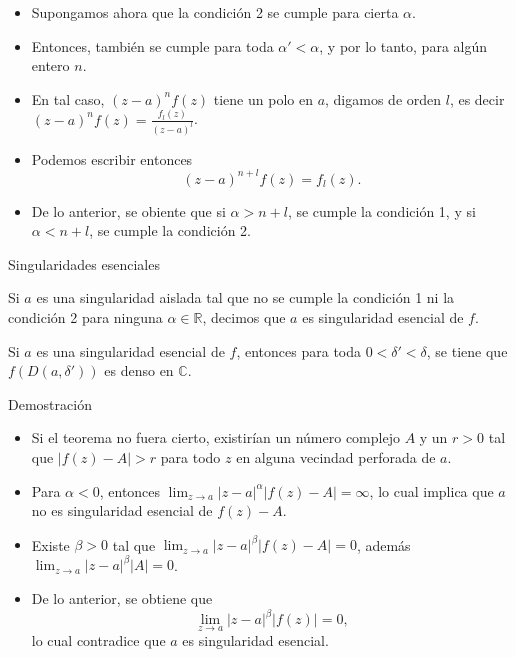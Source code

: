 \documentclass[spanish,presentation]{beamer}
\begin{document}
\begin{frame}[label=sec-2-3]{}
\begin{itemize}
\item Supongamos ahora que la condición 2 se cumple para cierta \(\alpha\).
\item Entonces, también se cumple para toda \(\alpha'<\alpha\), y por
lo tanto, para algún entero \(n\).
\item En tal caso, \((z-a)^{n}f(z)\) tiene un polo en \(a\), digamos
de orden \(l\), es decir \((z-a)^{n}f(z)=\frac{f_{l}(z)}{(z-a)^{l}}\).
\item Podemos escribir entonces
\begin{displaymath}
(z-a)^{n+l}f(z)=f_{l}(z).
\end{displaymath}
\item De lo anterior, se obiente que si \(\alpha>n+l\), se cumple la condición
1, y si \(\alpha<n+l\), se cumple la condición 2.
\end{itemize}
\end{frame}

\begin{frame}[label=sec-2-4]{Singularidades esenciales}
\begin{definition}
Si \(a\) es una singularidad aislada tal que no se cumple la
condición 1 ni la condición 2 para ninguna \(\alpha\in
    \mathbb{R}\), decimos que \(a\) es \alert{singularidad esencial} de \(f\).
\end{definition}

\begin{theorem}
Si \(a\) es una singularidad esencial de \(f\), entonces para toda
\(0<\delta'<\delta\), se tiene que \(f(D(a,\delta'))\) es denso en
\(\mathbb{C}\). 
\end{theorem}
\end{frame}

\begin{frame}[label=sec-2-5]{Demostración}
\begin{itemize}
\item Si el teorema no fuera cierto, existirían un número complejo
\(A\) y un \(r>0\) tal que \(|f(z)-A|>r\) para todo \(z\) en
alguna vecindad perforada de \(a\).
\item Para \(\alpha<0\), entonces \(\lim_{z\to
     a}|z-a|^{\alpha}|f(z)-A|=\infty\), lo cual implica que \(a\) no
es singularidad esencial de \(f(z)-A\).
\item Existe \(\beta>0\) tal que \(\lim_{z\to
     a}|z-a|^{\beta}|f(z)-A|=0\), además \(\lim_{z\to a}|z-a|^{\beta}|A|=0\).
\item De lo anterior, se obtiene que
\begin{displaymath}
\lim_{z\to a}|z-a|^{\beta}|f(z)|=0,
\end{displaymath}
lo cual contradice que \(a\) es singularidad esencial.
\end{itemize}
\end{frame}
\end{document}
